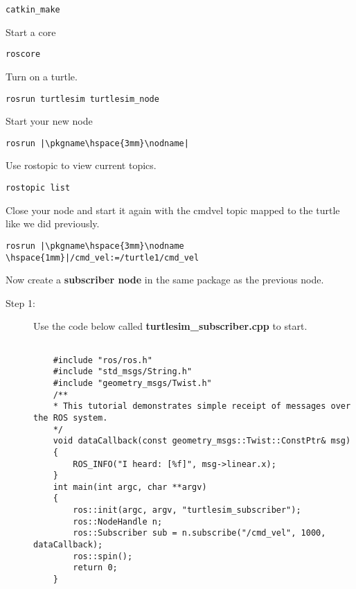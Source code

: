 \documentclass[12pt]{article}
\begin{document}
\begin{description}[labelindent=1cm]
\begin{description}
	\begin{verbatim}  
catkin_make
	\end{verbatim}
	
	Start a core
	\begin{verbatim} 
roscore
	\end{verbatim}
	
	Turn on a turtle.
	\begin{verbatim} 
rosrun turtlesim turtlesim_node
	\end{verbatim}
	
	Start your new node
	\begin{verbatim} 
rosrun |\pkgname\hspace{3mm}\nodname|
	\end{verbatim}
	
	Use rostopic to view current topics. 
	\begin{verbatim}  
rostopic list
	\end{verbatim}
	
	
	Close your node and start it again with the cmd\textunderscore vel topic mapped to the turtle like we did previously.
	\begin{verbatim} 
rosrun |\pkgname\hspace{3mm}\nodname \hspace{1mm}|/cmd_vel:=/turtle1/cmd_vel
	\end{verbatim}
	 
	\end{description}
	 
	 
	\newpage
	
	
\item[\textbf{\underline{Part III - Create A \href{http://wiki.ros.org/ROS/Tutorials/WritingPublisherSubscriber(c++)}{{\bf Subscriber }}Node:}}] \hfill \vspace{0mm}
	 	
	Now create a {\bf subscriber node} in the same package as the previous node. 
	
	\begin{description}
	
	\item [Step 1:] Use the code below called {\bf turtlesim\_subscriber.cpp} to start.\\
	
	\begin{lstlisting}
	
	#include "ros/ros.h"
	#include "std_msgs/String.h"
	#include "geometry_msgs/Twist.h"
	/**
	* This tutorial demonstrates simple receipt of messages over the ROS system.
	*/
	void dataCallback(const geometry_msgs::Twist::ConstPtr& msg)
	{
		ROS_INFO("I heard: [%f]", msg->linear.x);
	}
	int main(int argc, char **argv)
	{
		ros::init(argc, argv, "turtlesim_subscriber");
		ros::NodeHandle n;
		ros::Subscriber sub = n.subscribe("/cmd_vel", 1000, dataCallback);
		ros::spin();
		return 0;
	}
	

\end{lstlisting}
\end{description}
\end{description}
\end{document}
